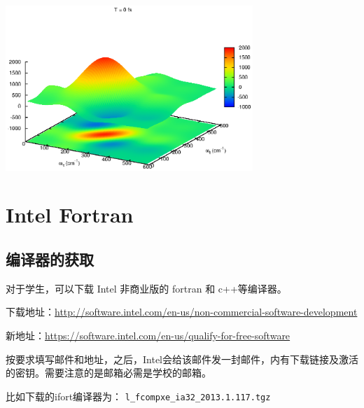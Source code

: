 \includegraphics[width=0.7\textwidth]{program/gnuplot/re_rp4.eps}







\newpage
\section{Intel Fortran}
\subsection{编译器的获取}
对于学生，可以下载 Intel 非商业版的 fortran 和 c++等编译器。

下载地址：\url{http://software.intel.com/en-us/non-commercial-software-development}

新地址：\url{https://software.intel.com/en-us/qualify-for-free-software}

按要求填写邮件和地址，之后，Intel会给该邮件发一封邮件，内有下载链接及激活的密钥。需要注意的是邮箱必需是学校的邮箱。

比如下载的ifort编译器为：  \verb|l_fcompxe_ia32_2013.1.117.tgz|



